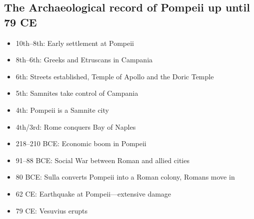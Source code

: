 \documentclass{article}
\begin{document}
\subsection{The Archaeological record of Pompeii up until 79 CE}
\begin{itemize}
\item 10th--8th: Early settlement at Pompeii
\item 8th--6th: Greeks and Etruscans in Campania
\item 6th: Streets established, Temple of Apollo and the Doric Temple
\item 5th: Samnites take control of Campania
\item 4th: Pompeii is a Samnite city
\item 4th/3rd: Rome conquers Bay of Naples
\item 218--210 BCE: Economic boom in Pompeii
\item 91--88 BCE: Social War between Roman and allied cities
\item 80 BCE: Sulla converts Pompeii into a Roman colony, Romans move in
\item 62 CE: Earthquake at Pompeii---extensive damage
\item 79 CE: Vesuvius erupts
\end{itemize}
\end{document}
